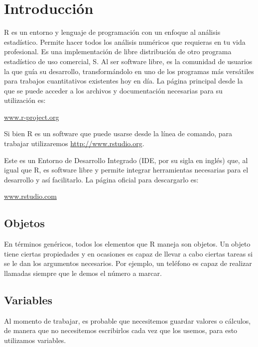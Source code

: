 \documentclass[
]{book}
\begin{document}
\hypertarget{introducciuxf3n}{%
\chapter{Introducción}\label{introducciuxf3n}}

R es un entorno y lenguaje de programación con un enfoque al análisis
estadístico. Permite hacer todos los análisis numéricos que requieras en
tu vida profesional. Es una implementación de libre distribución de otro
programa estadístico de uso comercial, S. Al ser software libre, es la
comunidad de usuarios la que guía su desarrollo, transformándolo en uno
de los programas más versátiles para trabajos cuantitativos existentes
hoy en día. La página principal desde la que se puede acceder a los
archivos y documentación necesarias para su utilización es:

\href{http://www.r-project.org}{www.r-project.org}

Si bien R es un software que puede usarse desde la línea de comando,
para trabajar utilizaremos \href{\%60R\%20Studio\%60}{http://www.rstudio.org}.

Este es un Entorno de Desarrollo Integrado (IDE, por su sigla en inglés)
que, al igual que R, es software libre y permite integrar herramientas
necesarias para el desarrollo y así facilitarlo. La página oficial para
descargarlo es:

\href{http://www.rstudio.com}{www.rstudio.com}

\hypertarget{objetos}{%
\section{Objetos}\label{objetos}}

En términos genéricos, todos los elementos que R maneja son objetos. Un
objeto tiene ciertas propiedades y en ocasiones es capaz de llevar a
cabo ciertas tareas si se le dan los argumentos necesarios. Por ejemplo,
un teléfono es capaz de realizar llamadas siempre que le demos el número
a marcar.

\hypertarget{variables}{%
\section{Variables}\label{variables}}

Al momento de trabajar, es probable que necesitemos guardar valores o
cálculos, de manera que no necesitemos escribirlos cada vez que los
usemos, para esto utilizamos variables.
\end{document}
